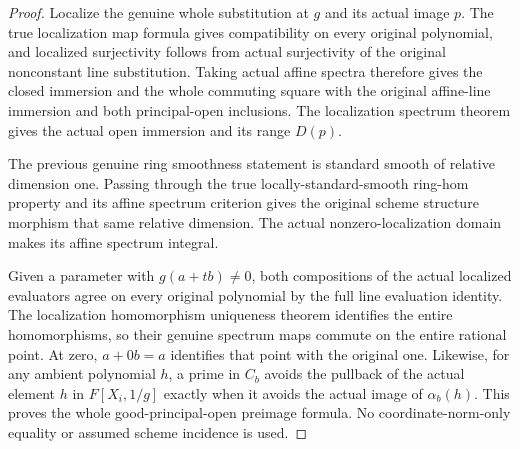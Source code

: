 \begin{proof}
Localize the genuine whole substitution at $g$ and its actual image $p$.
The true localization map formula gives compatibility on every original
polynomial, and localized surjectivity follows from actual surjectivity
of the original nonconstant line substitution. Taking actual affine
spectra therefore gives the closed immersion and the whole commuting
square with the original affine-line immersion and both principal-open
inclusions. The localization spectrum theorem gives the actual open
immersion and its range $D(p)$.

The previous genuine ring smoothness statement is standard smooth of
relative dimension one. Passing through the true locally-standard-smooth
ring-hom property and its affine spectrum criterion gives the original
scheme structure morphism that same relative dimension. The actual
nonzero-localization domain makes its affine spectrum integral.

Given a parameter with $g(a+tb)\ne0$, both compositions of the actual
localized evaluators agree on every original polynomial by the full
line evaluation identity. The localization homomorphism uniqueness
theorem identifies the entire homomorphisms, so their genuine spectrum
maps commute on the entire rational point. At zero, $a+0b=a$ identifies
that point with the original one. Likewise, for any ambient polynomial
$h$, a prime in $C_b$ avoids the pullback of the actual element $h$ in
$F[X_i,1/g]$ exactly when it avoids the actual image of $\alpha_b(h)$.
This proves the whole good-principal-open preimage formula. No
coordinate-norm-only equality or assumed scheme incidence is used.
\end{proof}

